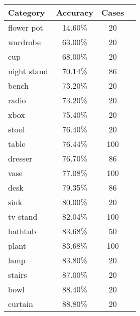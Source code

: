 \begin{table}[]
	\centering
	\begin{tabular}[t]{lccl}
		\hline
		\textbf{Category} & \textbf{Accuracy} & \textbf{Cases} & \hspace{4pt} \\ \hline
		flower pot        & 14.60\%           & 20             &              \\
		wardrobe          & 63.00\%           & 20             &              \\
		cup               & 68.00\%           & 20             &              \\
		night stand       & 70.14\%           & 86             &              \\
		bench             & 73.20\%           & 20             &              \\
		radio             & 73.20\%           & 20             &              \\
		xbox              & 75.40\%           & 20             &              \\
		stool             & 76.40\%           & 20             &              \\
		table             & 76.44\%           & 100            &              \\
		dresser           & 76.70\%           & 86             &              \\
		vase              & 77.08\%           & 100            &              \\
		desk              & 79.35\%           & 86             &              \\
		sink              & 80.00\%           & 20             &              \\
		tv stand          & 82.04\%           & 100            &              \\
		bathtub           & 83.68\%           & 50             &              \\
		plant             & 83.68\%           & 100            &              \\
		lamp              & 83.80\%           & 20             &              \\
		stairs            & 87.00\%           & 20             &              \\
		bowl              & 88.40\%           & 20             &              \\
		curtain           & 88.80\%           & 20             &              \\ \hline

\end{tabular}
\end{table}

